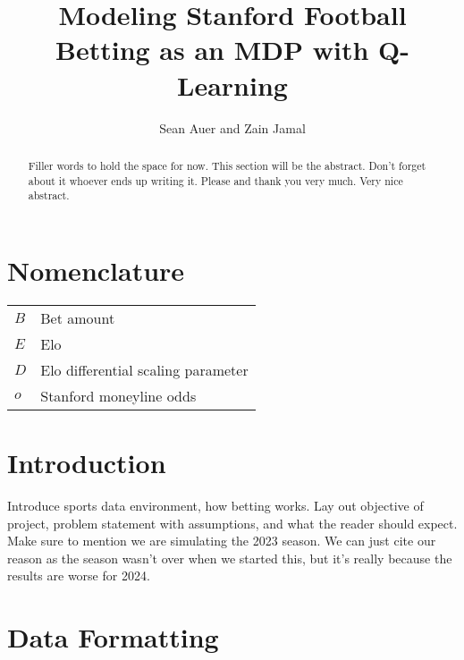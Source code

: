 \documentclass[conf]{new-aiaa}
\title{Modeling Stanford Football Betting as an MDP with Q-Learning}
\author{Sean Auer and Zain Jamal}
\affil{Stanford University, Stanford, CA, 94305, United States of America}
\begin{document}
\maketitle

\begin{abstract}
Filler words to hold the space for now. This section will be the abstract. Don't forget about it whoever ends up writing it. Please and thank you very much. Very nice abstract.
\end{abstract}

\section{Nomenclature}

{\renewcommand\arraystretch{1.0}
\noindent\begin{longtable*}{@{}l @{\quad=\quad} l@{}}
$B$ &  Bet amount \\
$E$ &  Elo \\
$D$ &  Elo differential scaling parameter\\
$o$ &  Stanford moneyline odds \\

\end{longtable*}}

\section{Introduction}
Introduce sports data environment, how betting works. Lay out objective of project, problem statement with assumptions, and what the reader should expect. Make sure to mention we are simulating the 2023 season. We can just cite our reason as the season wasn't over when we started this, but it's really because the results are worse for 2024.

\section{Data Formatting}
\end{document}
